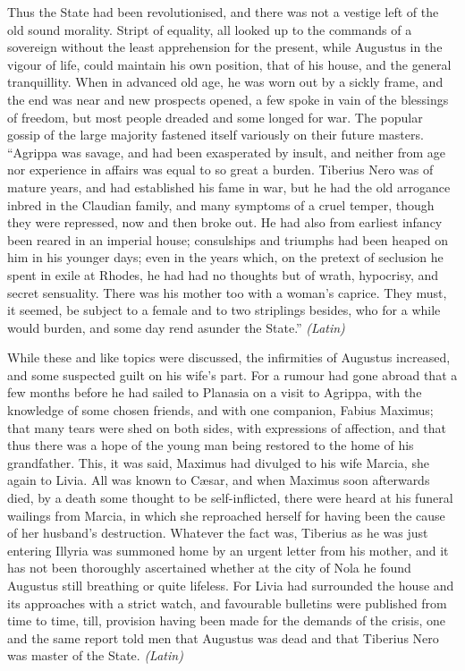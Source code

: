 Thus the State had been revolutionised, and there was not a vestige left of the old sound morality. Stript of equality, all looked up to the commands of a sovereign without the least apprehension for the present, while Augustus in the vigour of life, could maintain his own position, that of his house, and the general tranquillity. When in advanced old age, he was worn out by a sickly frame, and the end was near and new prospects opened, a few spoke in vain of the blessings of freedom, but most people dreaded and some longed for war. The popular gossip of the large majority fastened itself variously on their future masters. ``Agrippa was savage, and had been exasperated by insult, and neither from age nor experience in affairs was equal to so great a burden. Tiberius Nero was of mature years, and had established his fame in war, but he had the old arrogance inbred in the Claudian family, and many symptoms of a cruel temper, though they were repressed, now and then broke out. He had also from earliest infancy been reared in an imperial house; consulships and triumphs had been heaped on him in his younger days; even in the years which, on the pretext of seclusion he spent in exile at Rhodes, he had had no thoughts but of wrath, hypocrisy, and secret sensuality. There was his mother too with a woman's caprice. They must, it seemed, be subject to a female and to two striplings besides, who for a while would burden, and some day rend asunder the State.'' \emph{(Latin)}


While these and like topics were discussed, the infirmities of Augustus increased, and some suspected guilt on his wife's part. For a rumour had gone abroad that a few months before he had sailed to Planasia on a visit to Agrippa, with the knowledge of some chosen friends, and with one companion, Fabius Maximus; that many tears were shed on both sides, with expressions of affection, and that thus there was a hope of the young man being restored to the home of his grandfather. This, it was said, Maximus had divulged to his wife Marcia, she again to Livia. All was known to Cæsar, and when Maximus soon afterwards died, by a death some thought to be self-inflicted, there were heard at his funeral wailings from Marcia, in which she reproached herself for having been the cause of her husband's destruction. Whatever the fact was, Tiberius as he was just entering Illyria was summoned home by an urgent letter from his mother, and it has not been thoroughly ascertained whether at the city of Nola he found Augustus still breathing or quite lifeless. For Livia had surrounded the house and its approaches with a strict watch, and favourable bulletins were published from time to time, till, provision having been made for the demands of the crisis, one and the same report told men that Augustus was dead and that Tiberius Nero was master of the State. \emph{(Latin)}

